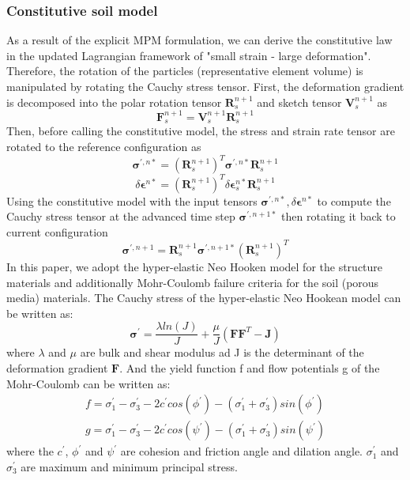 \documentclass[preprint,12pt]{elsarticle}
\begin{document}
\subsubsection{Constitutive soil model}
As a result of the explicit MPM formulation, we can derive the constitutive law in the updated Lagrangian framework of "small strain - large deformation". Therefore, the rotation of the particles (representative element volume) is manipulated by rotating the Cauchy stress tensor. First, the deformation gradient is decomposed into the polar rotation tensor $\pmb{R}_s^{n+1}$ and sketch tensor $\pmb{V}_s^{n+1}$ as
%
%
\begin{equation}
     \pmb{F}_s^{n+1} = \pmb{V}_s^{n+1} \pmb{R}_s^{n+1}
\end{equation}
%
%
Then, before calling the constitutive model, the stress and strain rate tensor are rotated to the reference configuration as
%
%
\begin{equation}
     \pmb{\sigma}^{\prime,n*} =  (\pmb{R}_s^{n+1})^T \pmb{\sigma}^{\prime,n*} \pmb{R}_s^{n+1}
\end{equation}
%
%
\begin{equation}
    \delta \pmb{\epsilon}^{n*} =  (\pmb{R}_s^{n+1})^T \delta \pmb{\epsilon}_s^{n*} \pmb{R}_s^{n+1}
\end{equation}
%
%
Using the constitutive model with the input tensors $\pmb{\sigma}^{\prime,n*}, \delta \pmb{\epsilon}^{n*}$ to compute the Cauchy stress tensor at the advanced time step $\pmb{\sigma}^{\prime,n+1*}$ then rotating it back to current configuration
%
%
\begin{equation}
    \pmb{\sigma}^{\prime,n+1} =  \pmb{R}_s^{n+1} \pmb{\sigma}^{\prime,n+1*} (\pmb{R}_s^{n+1})^T
\end{equation}
%
%
In this paper, we adopt the hyper-elastic Neo Hooken model for the structure materials and additionally Mohr-Coulomb failure criteria for the soil (porous media) materials. The Cauchy stress of the hyper-elastic Neo Hookean model can be written as:
%
%
\begin{equation}
    \pmb{\sigma}^{\prime} =  \frac{ \lambda ln(J)}{J} + \frac{\mu}{J} (\pmb{F} \pmb{F}^T - \pmb{J})
\end{equation}
%
%
where $\lambda$ and $\mu$ are bulk and shear modulus ad J is the determinant of the deformation gradient $\pmb{F}$. And the yield function f and flow potentials g of the Mohr-Coulomb can be written as:
%
%
\begin{equation}
\begin{gathered}
   f =  \sigma_1^{\prime} -  \sigma_3^{\prime} -2c^{\prime} cos(\phi^{\prime}) - (\sigma_1^{\prime} +  \sigma_3^{\prime})sin(\phi^{\prime})\\
   g =  \sigma_1^{\prime} -  \sigma_3^{\prime} -2c^{\prime} cos(\psi^{\prime}) - (\sigma_1^{\prime} +  \sigma_3^{\prime})sin(\psi^{\prime})
\end{gathered}
\end{equation}
%
%
where the $c^{\prime}$, $\phi^{\prime}$ and $\psi^{\prime}$ are cohesion and friction angle and dilation angle. $\sigma_1^{\prime}$ and $\sigma_3^{\prime}$ are maximum and minimum principal stress.
\end{document}
